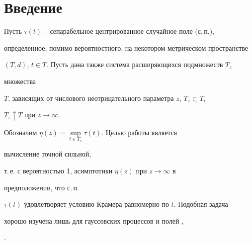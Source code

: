  


\date{} 




 


\pagestyle{plain} %


 


 




 


\maketitle 


 




 


\section*{Введение} 


 


Пусть $\tau(t)$ -- сепарабельное центрированное случайное поле (с.\,п.), 


определенное, помимо вероятностного, на некотором метрическом пространстве 


$(T,d)$, $t\in T$. Пусть дана также система расширяющихся подмножеств $T_z$ 


множества 


$T$, зависящих от числового неотрицательного параметра $z$, $T_z\subset T$, 


$T_z\uparrow T$ при $z\to\infty$. 


Обозначим $\eta(z)=\sup\limits_{t\in T_z}\tau(t)$. Целью работы является 


вычисление точной сильной, 


т.\,е. с вероятностью 1, асимптотики $\eta(z)$ при $z\to\infty$ в 


предположении, что с.\,п. 


$\tau(t)$ удовлетворяет условию Крамера равномерно по $t$. Подобная задача


хорошо изучена лишь для гауссовских процессов и полей \cite{Yud}, 


\cite{Mal}. 


